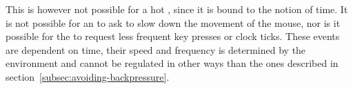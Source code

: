 This is however not possible for a hot \obs, since it is bound to the notion of time. It is not possible for an \obv to ask to slow down the movement of the mouse, nor is it possible for the \obv to request less frequent key presses or clock ticks. These events are dependent on time, their speed and frequency is determined by the environment \cite{berry1991-Reactive} and cannot be regulated in other ways than the ones described in section~\ref{subsec:avoiding-backpressure}.